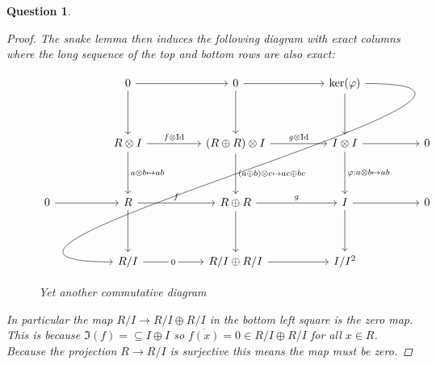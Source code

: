 \documentclass{article}
\DeclareMathOperator{\Id}{Id}
\newtheorem{question}{Question}
\theoremstyle{definition}
\begin{document}
\begin{question}
\begin{enumerate}[(a)]
\begin{proof}
                  The snake lemma then induces the following diagram with exact
                  columns where the long sequence of the top and bottom rows are
                  also exact:
                  \begin{figure}[H]
                      \[\begin{tikzcd}[ampersand replacement=\&]
                              \&\& 0 \&\& 0 \&\& {\ker(\varphi)} \\
                              \\
                              \&\& {R\otimes I} \&\& {(R\oplus R)\otimes I} \&\& {I\otimes I} \&\& 0 \\
                              \\
                              0 \&\& R \&\& {R\oplus R} \&\& I \&\& 0 \\
                              \\
                              \&\& {R/I} \&\& {R/I\oplus R/I} \&\& {I/I^{2}}
                              \arrow["f\otimes\Id", from=3-3, to=3-5]
                              \arrow["g\otimes\Id", from=3-5, to=3-7]
                              \arrow[from=3-7, to=3-9]
                              \arrow["{a\otimes b\mapsto ab}", from=3-3, to=5-3]
                              \arrow["{(a\oplus b)\otimes c\mapsto ac\oplus bc}", from=3-5, to=5-5]
                              \arrow["{\varphi:a\otimes b\mapsto ab}", from=3-7, to=5-7]
                              \arrow["f", from=5-3, to=5-5]
                              \arrow["g", from=5-5, to=5-7]
                              \arrow[from=5-5, to=7-5]
                              \arrow[from=5-7, to=7-7]
                              \arrow[from=5-3, to=7-3]
                              \arrow[from=1-3, to=3-3]
                              \arrow[from=1-5, to=3-5]
                              \arrow[from=1-3, to=1-5]
                              \arrow[from=1-5, to=1-7]
                              \arrow[from=1-7, to=3-7]
                              \arrow["0"{description}, from=7-3, to=7-5]
                              \arrow[from=7-5, to=7-7]
                              \arrow[from=1-7, to=7-3, out=0, in=180, looseness=2, overlay]
                              \arrow[from=5-1, to=5-3]
                              \arrow[from=5-7, to=5-9]
                          \end{tikzcd}\]
                      \caption{Yet another commutative diagram}
                  \end{figure}
                  In particular the map \(R/I\to R/I\oplus R/I\) in the bottom
                  left square is the zero map. This is because
                  \(\Im(f)=\subseteq I\oplus I\) so \(\overline{f(x)}=0\in
                  R/I\oplus R/I\) for all \(x\in R\). Because the projection
                  \(R\to R/I\) is surjective this means the map must be zero.


\end{proof}
\end{enumerate}
\end{question}
\end{document}
